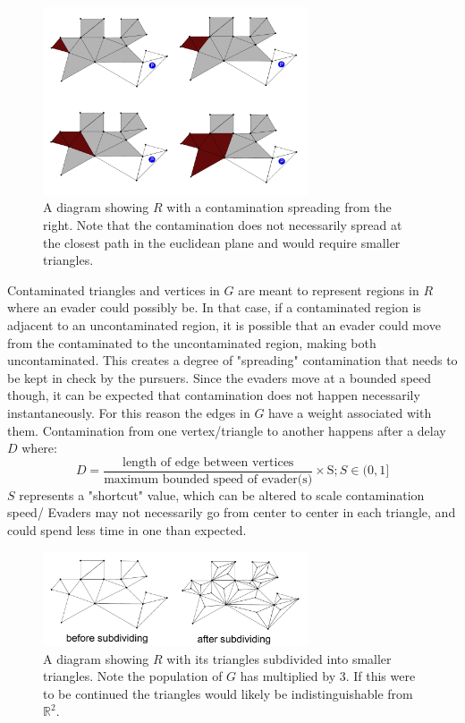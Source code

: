 \documentclass{article}
\begin{document}
\begin{figure}[htb]
\centering
\includegraphics[width=0.7\textwidth]{"contamination"}
\caption{A diagram showing \(R\) with a contamination spreading from the right. Note that the contamination does not necessarily spread at the closest path in the euclidean plane and would require smaller triangles.}
\end{figure}

Contaminated triangles and vertices in \(G\) are meant to represent regions in \(R\) where an evader could possibly be. In that case, if a contaminated region is adjacent to an uncontaminated region, it is possible that an evader could move from the contaminated to the uncontaminated region, making both uncontaminated. This creates a degree of "spreading" contamination that needs to be kept in check by the pursuers. Since the evaders move at a bounded speed though, it can be expected that contamination does not happen necessarily instantaneously. For this reason the edges in \(G\) have a weight associated with them. Contamination from one vertex/triangle to another happens after a delay \(D\) where: \begin{displaymath}
D = \frac{\text{length of edge between vertices}}{\text{maximum bounded speed of evader(s)}}\times \text{S} ; S\in(0,1]
\end{displaymath}\(S\) represents a "shortcut" value, which can be altered to scale contamination speed/ Evaders may not necessarily go from center to center in each triangle, and could spend less time in one than expected.

\begin{figure}[htb]
\centering
\includegraphics[width=0.7\textwidth]{"tesslation"}
\caption{A diagram showing \(R\) with its triangles subdivided into smaller triangles. Note the population of \(G\) has multiplied by 3. If this were to be continued the triangles would likely be indistinguishable from \(\mathbb{R}^2\).}
\end{figure}
\end{document}
